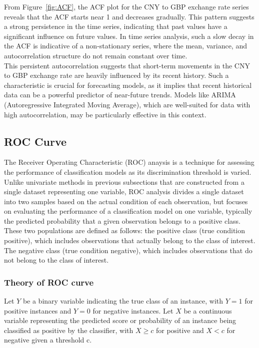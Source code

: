\documentclass{article}\usepackage[]{graphicx}\usepackage[]{xcolor}
\numberwithin{equation}{section}
\begin{document}
\noindent
From Figure~\ref{fig:ACF}, the ACF plot for the CNY to GBP exchange rate series reveals that the ACF starts near 1 and decreases gradually. This pattern suggests a strong persistence in the time series, indicating that past values have a significant influence on future values. In time series analysis, such a slow decay in the ACF is indicative of a non-stationary series, where the mean, variance, and autocorrelation structure do not remain constant over time.\\

\noindent
This persistent autocorrelation suggests that short-term movements in the CNY to GBP exchange rate are heavily influenced by its recent history. Such a characteristic is crucial for forecasting models, as it implies that recent historical data can be a powerful predictor of near-future trends. Models like ARIMA (Autoregressive Integrated Moving Average), which are well-suited for data with high autocorrelation, may be particularly effective in this context.

\subsection{ROC Curve}

The Receiver Operating Characteristic (ROC) anaysis is a technique for assessing the performance of classification models as its discrimination threshold is varied. Unlike univariate methods in previous subsections that are constructed from a single dataset representing one variable, ROC analysis divides a single dataset into two samples based on the actual condition of each observation, but focuses on evaluating the performance of a classification model on one variable, typically the predicted probability that a given observation belongs to a positive class. These two populations are defined as follows: the positive class (true condition positive), which includes observations that actually belong to the class of interest. The negative class (true condition negative), which includes observations that do not belong to the class of interest.

\subsubsection{Theory of ROC curve}

Let $Y$ be a binary variable indicating the true class of an instance, with $Y = 1$ for positive instances and $Y = 0$ for negative instances. Let $X$ be a continuous variable representing the predicted score or probability of an instance being classified as positive by the classifier, with $X \geq c$ for positive and $X < c$ for negative given a threshold c.\\
\end{document}
